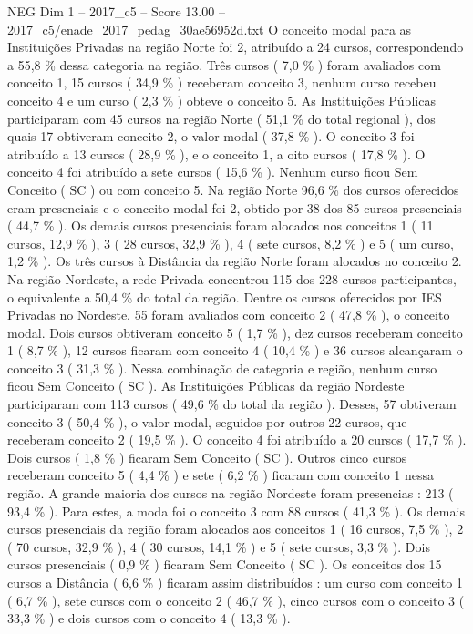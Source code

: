 \begin{textsample}{NEG Dim 1 – 2017\_c5 – Score 13.00 – 2017\_c5/enade\_2017\_pedag\_30ae56952d.txt}
O conceito modal para as Instituições Privadas na região Norte foi 2, atribuído a 24 cursos, correspondendo a 55,8 \% dessa categoria na região.
Três cursos ( 7,0 \% ) foram avaliados com conceito 1, 15 cursos ( 34,9 \% ) receberam conceito 3, nenhum curso recebeu conceito 4 e um curso ( 2,3 \% ) obteve o conceito 5.
As Instituições Públicas participaram com 45 cursos na região Norte ( 51,1 \% do total regional ), dos quais 17 obtiveram conceito 2, o valor modal ( 37,8 \% ).
O conceito 3 foi atribuído a 13 cursos ( 28,9 \% ), e o conceito 1, a oito cursos ( 17,8 \% ).
O conceito 4 foi atribuído a sete cursos ( 15,6 \% ).
Nenhum curso ficou Sem Conceito ( SC ) ou com conceito 5.
Na região Norte 96,6 \% dos cursos oferecidos eram presenciais e o conceito modal foi 2, obtido por 38 dos 85 cursos presenciais ( 44,7 \% ).
Os demais cursos presenciais foram alocados nos conceitos 1 ( 11 cursos, 12,9 \% ), 3 ( 28 cursos, 32,9 \% ), 4 ( sete cursos, 8,2 \% ) e 5 ( um curso, 1,2 \% ).
Os três cursos à Distância da região Norte foram alocados no conceito 2.
Na região Nordeste, a rede Privada concentrou 115 dos 228 cursos participantes, o equivalente a 50,4 \% do total da região.
Dentre os cursos oferecidos por IES Privadas no Nordeste, 55 foram avaliados com conceito 2 ( 47,8 \% ), o conceito modal.
Dois cursos obtiveram conceito 5 ( 1,7 \% ), dez cursos receberam conceito 1 ( 8,7 \% ), 12 cursos ficaram com conceito 4 ( 10,4 \% ) e 36 cursos alcançaram o conceito 3 ( 31,3 \% ).
Nessa combinação de categoria e região, nenhum curso ficou Sem Conceito ( SC ).
As Instituições Públicas da região Nordeste participaram com 113 cursos ( 49,6 \% do total da região ).
Desses, 57 obtiveram conceito 3 ( 50,4 \% ), o valor modal, seguidos por outros 22 cursos, que receberam conceito 2 ( 19,5 \% ).
O conceito 4 foi atribuído a 20 cursos ( 17,7 \% ).
Dois cursos ( 1,8 \% ) ficaram Sem Conceito ( SC ).
Outros cinco cursos receberam conceito 5 ( 4,4 \% ) e sete ( 6,2 \% ) ficaram com conceito 1 nessa região.
A grande maioria dos cursos na região Nordeste foram presencias : 213 ( 93,4 \% ).
Para estes, a moda foi o conceito 3 com 88 cursos ( 41,3 \% ).
Os demais cursos presenciais da região foram alocados aos conceitos 1 ( 16 cursos, 7,5 \% ), 2 ( 70 cursos, 32,9 \% ), 4 ( 30 cursos, 14,1 \% ) e 5 ( sete cursos, 3,3 \% ).
Dois cursos presenciais ( 0,9 \% ) ficaram Sem Conceito ( SC ).
Os conceitos dos 15 cursos a Distância ( 6,6 \% ) ficaram assim distribuídos : um curso com conceito 1 ( 6,7 \% ), sete cursos com o conceito 2 ( 46,7 \% ), cinco cursos com o conceito 3 ( 33,3 \% ) e dois cursos com o conceito 4 ( 13,3 \% ).

\end{textsample}
